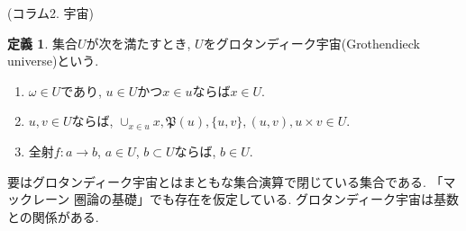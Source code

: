 \documentclass[dvipdfmx,a4paper,11pt]{article}
\theoremstyle{definition}
\newtheorem{dfn}[thm]{定義}
\begin{document}
   (コラム2. 宇宙)
   \begin{tcolorbox}[
    colback = white,
    colframe = black!35!black,
    fonttitle = \bfseries,
    breakable = true]
    \begin{dfn}%
集合$U$が次を満たすとき, $U$をグロタンディーク宇宙(Grothendieck universe)という. 

\vspace{-13pt}
  \begin{enumerate}[label=(\alph*).]
 \setlength{\parskip}{0cm}
  \setlength{\itemsep}{0pt}
\item $\omega\in U$であり, $u \in U$かつ$x \in u$ならば$x \in U$.
\item $u, v\in U$ならば, $\cup_{x \in u}x, \mathfrak{P}(u), \{u,v \}, (u,v), u \times v \in U$.
\item 全射$f : a \to b$, $a \in U$, $b \subset U$ならば, $b\in U$.
\end{enumerate}
 \end{dfn}
 \end{tcolorbox}
要はグロタンディーク宇宙とはまともな集合演算で閉じている集合である.
「マックレーン 圏論の基礎」でも存在を仮定している. 
グロタンディーク宇宙は基数との関係がある. 
\end{document}
